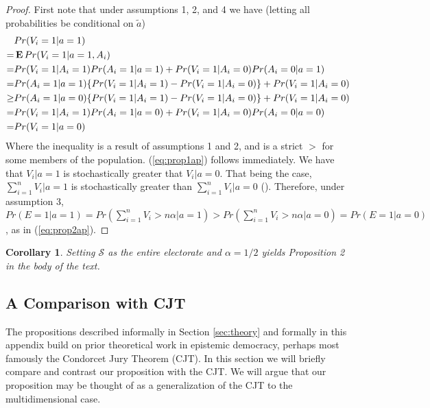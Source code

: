 \documentclass[11pt]{article}
\newcommand{\E}{\mathop{\bf E\/}}
\newtheorem{cor}{Corollary}
\begin{document}
\begin{proof}
First note that
under assumptions 1, 2, and 4 we have (letting all probabilities be conditional on $\tilde{a}$)
\begin{align*}
&Pr(V_i=1|a=1)\\
=&\E Pr(V_i=1|a=1,A_i)\\
=&Pr(V_i=1|A_i=1)Pr(A_i=1|a=1)+Pr(V_i=1|A_i=0)Pr(A_i=0|a=1)\\
=&Pr(A_i=1|a=1)\{Pr(V_i=1|A_i=1)-Pr(V_i=1|A_i=0)\}+Pr(V_i=1|A_i=0)\\
\ge&Pr(A_i=1|a=0)\{Pr(V_i=1|A_i=1)-Pr(V_i=1|A_i=0)\}+Pr(V_i=1|A_i=0)\\
=&Pr(V_i=1|A_i=1)Pr(A_i=1|a=0)+Pr(V_i=1|A_i=0)Pr(A_i=0|a=0)\\
=&Pr(V_i=1|a=0)
\end{align*}
Where the inequality is a result of assumptions 1 and 2, and is a strict $>$ for some members of the population.
(\ref{eq:prop1ap}) follows immediately.
We have that $V_i|a=1$ is stochastically greater that $V_i|a=0$. That being the case, $\sum_{i=1}^n V_i |a=1$ is stochastically greater than $\sum_{i=1}^n V_i |a=0$ (\citet{shaked2007stochastic}).
Therefore, under assumption 3, $Pr(E=1|a=1)=Pr(\sum_{i=1}^n V_i
>n\alpha|a=1)>Pr(\sum_{i=1}^n V_i>n\alpha |a=0)=Pr(E=1|a=0)$, as in (\ref{eq:prop2ap}).
\end{proof}

\begin{cor}
Setting $\mathcal{S}$ as the entire electorate and $\alpha=1/2$
yields Proposition 2 in the body of the text.
\end{cor}

\subsection{A Comparison with CJT}\label{sec:cjt-compare}

The propositions described informally in Section \ref{sec:theory} and formally in this appendix build on prior theoretical work in epistemic democracy, perhaps most famously the Condorcet Jury Theorem (CJT).
In this section we will briefly compare and contrast our proposition with the CJT.
We will argue that our proposition may be thought of as a generalization of the CJT to the multidimensional case.
\end{document}
